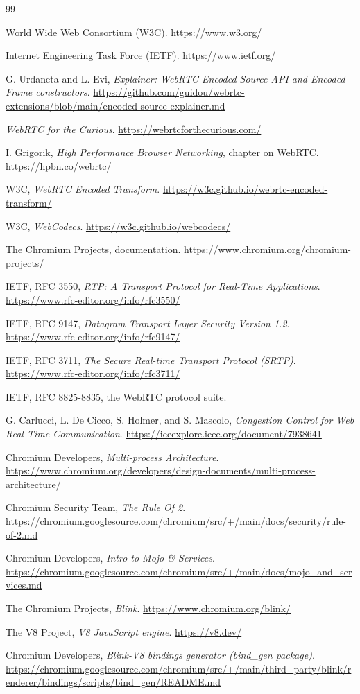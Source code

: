 \documentclass[11pt]{article}
\begin{document}
\renewcommand{\refname}{}
\begin{thebibliography}{99}

World Wide Web Consortium (W3C).
\url{https://www.w3.org/}

Internet Engineering Task Force (IETF).
\url{https://www.ietf.org/}

G. Urdaneta and L. Evi,
\emph{Explainer: WebRTC Encoded Source API and Encoded Frame constructors}.
\url{https://github.com/guidou/webrtc-extensions/blob/main/encoded-source-explainer.md}

\emph{WebRTC for the Curious}.
\url{https://webrtcforthecurious.com/}

I. Grigorik,
\emph{High Performance Browser Networking}, chapter on WebRTC.
\url{https://hpbn.co/webrtc/}

W3C,
\emph{WebRTC Encoded Transform}.
\url{https://w3c.github.io/webrtc-encoded-transform/}

W3C,
\emph{WebCodecs}.
\url{https://w3c.github.io/webcodecs/}

The Chromium Projects, documentation.
\url{https://www.chromium.org/chromium-projects/}

IETF, RFC 3550,
\emph{RTP: A Transport Protocol for Real-Time Applications}.
\url{https://www.rfc-editor.org/info/rfc3550/}

IETF, RFC 9147,
\emph{Datagram Transport Layer Security Version 1.2}.
\url{https://www.rfc-editor.org/info/rfc9147/}

IETF, RFC 3711,
\emph{The Secure Real-time Transport Protocol (SRTP)}.
\url{https://www.rfc-editor.org/info/rfc3711/}

IETF, RFC 8825-8835, the WebRTC protocol suite.

G. Carlucci, L. De Cicco, S. Holmer, and S. Mascolo,
\emph{Congestion Control for Web Real-Time Communication}.
\url{https://ieeexplore.ieee.org/document/7938641}

Chromium Developers,
\emph{Multi-process Architecture}.
\url{https://www.chromium.org/developers/design-documents/multi-process-architecture/}

Chromium Security Team,
\emph{The Rule Of 2}.
\url{https://chromium.googlesource.com/chromium/src/+/main/docs/security/rule-of-2.md}

Chromium Developers,
\emph{Intro to Mojo \& Services}.
\url{https://chromium.googlesource.com/chromium/src/+/main/docs/mojo_and_services.md}

The Chromium Projects,
\emph{Blink}.
\url{https://www.chromium.org/blink/}

The V8 Project,
\emph{V8 JavaScript engine}.
\url{https://v8.dev/}

Chromium Developers,
\emph{Blink-V8 bindings generator (bind\_gen package)}.
\url{https://chromium.googlesource.com/chromium/src/+/main/third_party/blink/renderer/bindings/scripts/bind_gen/README.md}

\end{thebibliography}
\end{document}
